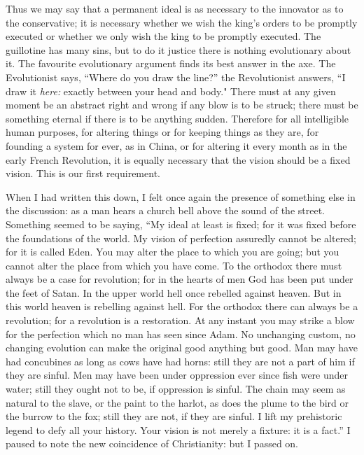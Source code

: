 \documentclass{book}
\begin{document}
Thus we may say that a permanent ideal is as necessary to the innovator as to the conservative; it is necessary whether we wish the king’s orders to be promptly executed or whether we only wish the king to be promptly executed. The guillotine has many sins, but to do it justice there is nothing evolutionary about it. The favourite evolutionary argument finds its best answer in the axe. The Evolutionist says, “Where do you draw the line?” the Revolutionist answers, “I draw it \emph{here:} exactly between your head and body." There must at any given moment be an abstract right and wrong if any blow is to be struck; there must be something eternal if there is to be anything sudden. Therefore for all intelligible human purposes, for altering things or for keeping things as they are, for founding a system for ever, as in China, or for altering it every month as in the early French Revolution, it is equally necessary that the vision should be a fixed vision. This is our first requirement.

When I had written this down, I felt once again the presence of something else in the discussion: as a man hears a church bell above the sound of the street. Something seemed to be saying, “My ideal at least is fixed; for it was fixed before the foundations of the world. My vision of perfection assuredly cannot be altered; for it is called Eden. You may alter the place to which you are going; but you cannot alter the place from which you have come. To the orthodox there must always be a case for revolution; for in the hearts of men God has been put under the feet of Satan. In the upper world hell once rebelled against heaven. But in this world heaven is rebelling against hell. For the orthodox there can always be a revolution; for a revolution is a restoration. At any instant you may strike a blow for the perfection which no man has seen since Adam. No unchanging custom, no changing evolution can make the original good anything but good. Man may have had concubines as long as cows have had horns: still they are not a part of him if they are sinful. Men may have been under oppression ever since fish were under water; still they ought not to be, if oppression is sinful. The chain may seem as natural to the slave, or the paint to the harlot, as does the plume to the bird or the burrow to the fox; still they are not, if they are sinful. I lift my prehistoric legend to defy all your history. Your vision is not merely a fixture: it is a fact.” I paused to note the new coincidence of Christianity: but I passed on.
\end{document}
